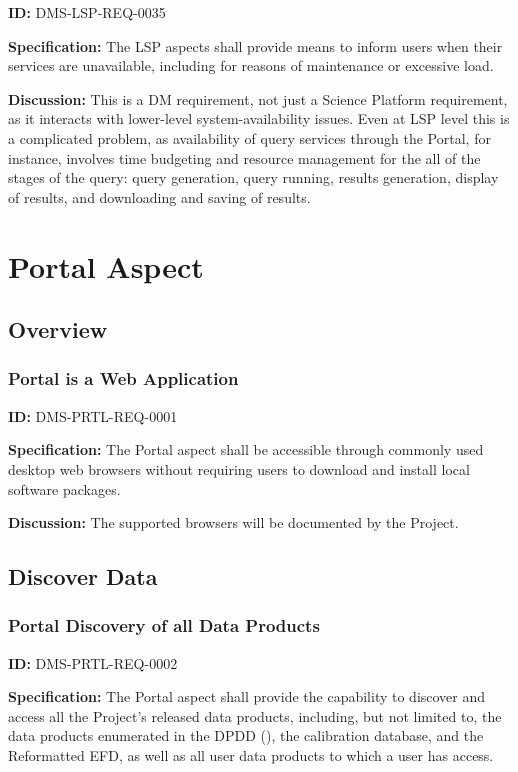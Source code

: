 \documentclass[SE,toc,lsstdraft]{lsstdoc}
\begin{document}
\label{DMS-LSP-REQ-0035}
\textbf{ID:} DMS-LSP-REQ-0035

\textbf{Specification:}
The LSP aspects shall provide means to inform users when their services are unavailable, including for reasons of maintenance or excessive load.

\textbf{Discussion:}
This is a DM requirement, not just a Science Platform requirement, as it interacts with lower-level system-availability issues.
Even at LSP level this is a complicated problem, as availability of query services through the Portal, for instance, involves time budgeting and resource management for the all of the stages of the query: query generation, query running, results generation, display of results, and downloading and saving of results.

\section{Portal Aspect}

\subsection{Overview}

\subsubsection{Portal is a Web Application}

\label{DMS-PRTL-REQ-0001}
\textbf{ID:} DMS-PRTL-REQ-0001

\textbf{Specification:}
The Portal aspect shall be accessible through commonly used desktop web browsers without requiring users to download and install local software packages.

\textbf{Discussion:}
The supported browsers will be documented by the Project.

\subsection{Discover Data}

\subsubsection{Portal Discovery of all Data Products}

\label{DMS-PRTL-REQ-0002}
\textbf{ID:} DMS-PRTL-REQ-0002

\textbf{Specification:}
The Portal aspect shall provide the capability to discover and access all the Project's released data products, including, but not limited to, the data products enumerated in the DPDD (), the calibration database, and the Reformatted EFD, as well as all user data products to which a user has access.
\end{document}
